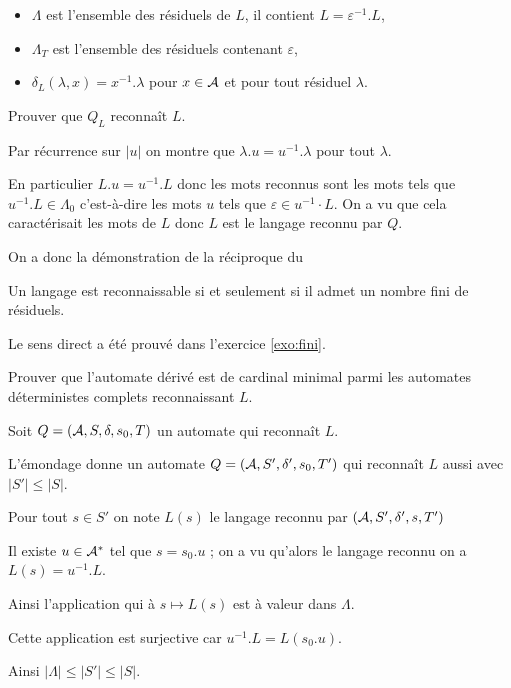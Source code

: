 \begin{itemize}
\item $\Lambda$ est l'ensemble des résiduels de $L$, il contient $L=\varepsilon^{-1}.L$,
\item $\Lambda_T$ est l'ensemble des résiduels contenant $\varepsilon$,
\item $\delta_L(\lambda,x)=x^{-1}.\lambda$ pour $x\in {\cal A}$ et pour tout résiduel $\lambda$.
\end{itemize}
\begin{Exercise}[title = Langage reconnu]

Prouver que $Q_L$ reconnaît $L$.
\end{Exercise}
\begin{Answer}
Par récurrence sur $|u|$ on montre que $\lambda.u=u^{-1}.\lambda$ pour tout $\lambda$. 

En particulier $L.u=u^{-1}.L$ donc les mots reconnus sont les mots tels que $u^{-1}. L \in \Lambda_0$ c'est-à-dire les mots $u$  tels que $\varepsilon\in u^{-1}\cdot L$. On a vu que cela caractérisait les mots de $L$ donc $L$ est le langage reconnu par $Q$.
\end{Answer}
\medskip
On a donc la démonstration de la réciproque du
\begin{thm}
Un langage est reconnaissable si et seulement si il admet un nombre fini de résiduels.
\end{thm}
Le sens direct a été prouvé dans l'exercice \ref{exo:fini}.
\begin{Exercise}[title = Minimalité]
Prouver que l'automate dérivé est de cardinal minimal parmi les automates déterministes complets reconnaissant $L$.
\end{Exercise}
\begin{Answer}
Soit $Q=({\cal A},S,\delta,s_0,T)$ un automate qui reconnaît $L$.

L'émondage donne un automate $Q=({\cal A},S',\delta',s_0,T')$ qui reconnaît $L$ aussi avec $|S'| \le |S|$.

Pour tout $s\in S'$ on note $L(s)$ le langage reconnu par $({\cal A},S',\delta',s,T')$

Il existe $u \in  {\cal A}^*$ tel que $s=s_0.u$ ; on a vu qu'alors le langage reconnu on a $L(s) = u^{-1}.L$.

Ainsi l'application qui à $s \mapsto L(s)$ est à valeur dans $\Lambda$. 

Cette application est surjective car $u^{-1}.L = L(s_0.u)$.

Ainsi $|\Lambda| \le |S'| \le |S|$.
\end{Answer}

